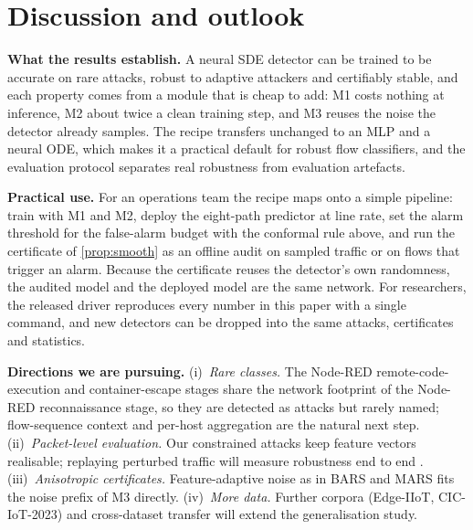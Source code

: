 \section{Discussion and outlook}\label{sec:disc}
\textbf{What the results establish.} A neural SDE detector can be trained to be
accurate on rare attacks, robust to adaptive attackers and certifiably stable,
and each property comes from a module that is cheap to add: M1 costs nothing at
inference, M2 about twice a clean training step, and M3 reuses the noise the
detector already samples. The recipe transfers unchanged to an MLP and a neural
ODE, which makes it a practical default for robust flow classifiers, and the
evaluation protocol separates real robustness from evaluation artefacts.

\textbf{Practical use.} For an operations team the recipe maps onto a simple
pipeline: train with M1 and M2, deploy the eight-path predictor at line rate,
set the alarm threshold for the false-alarm budget with the conformal rule
above, and run the certificate of \cref{prop:smooth} as an offline audit on
sampled traffic or on flows that trigger an alarm. Because the certificate reuses the
detector's own randomness, the audited model and the deployed model are the
same network. For researchers, the released driver reproduces every number in
this paper with a single command, and new detectors can be dropped into the
same attacks, certificates and statistics.

\textbf{Directions we are pursuing.}
(i)~\emph{Rare classes.} The Node-RED remote-code-execution and container-escape
stages share the network footprint of the Node-RED reconnaissance stage, so they
are detected as attacks but rarely named; flow-sequence context and per-host
aggregation are the natural next step.
(ii)~\emph{Packet-level evaluation.} Our constrained attacks keep feature vectors
realisable; replaying perturbed traffic will measure robustness end to end
\citep{simonetto2024tabularbench}.
(iii)~\emph{Anisotropic certificates.} Feature-adaptive noise as in BARS and MARS
\citep{wang2023bars,huang2025mars} fits the noise prefix of M3 directly.
(iv)~\emph{More data.} Further corpora (Edge-IIoT, CIC-IoT-2023) and
cross-dataset transfer will extend the generalisation study.

